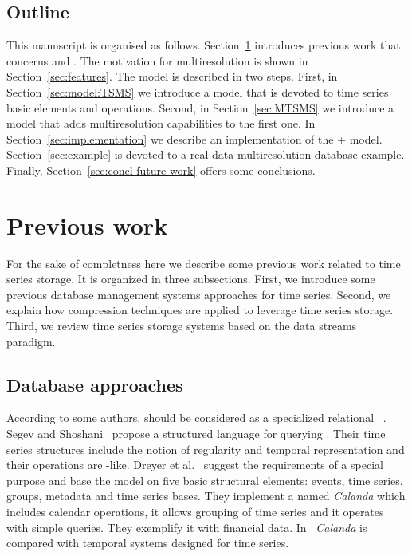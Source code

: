 \subsection{Outline}

This manuscript is organised as
follows. Section~\ref{sec:related-work} introduces previous work that
concerns  and .  The motivation for
multiresolution is shown in Section~\ref{sec:features}.  The model is
described in two steps.
%
First, in Section~\ref{sec:model:TSMS} we introduce a 
model that is devoted to time series basic elements and operations.
%
Second, in Section~\ref{sec:MTSMS} we introduce a  model
that adds multiresolution capabilities to the first one.
%
In Section~\ref{sec:implementation} we describe an implementation of
the + model.  Section~\ref{sec:example} is
devoted to a real data multiresolution database example.  Finally,
Section~\ref{sec:concl-future-work} offers some conclusions.




\section{Previous work}
\label{sec:related-work}

For the sake of completness here we describe some previous work
related to time series storage. It is organized in three subsections.
First, we introduce some previous database management systems
approaches for time series. Second, we explain how compression
techniques are applied to leverage time series storage. Third, we
review time series storage systems based on the data streams paradigm.


\subsection{Database approaches}

According to some authors,  should be considered as a
specialized relational ~\cite{last01}.  Segev and
Shoshani~\cite{segev87:sigmod} propose a structured language for
querying . Their time series structures include the notion
of regularity and temporal representation and their operations are
-like.  Dreyer et al.~\cite{dreyer94} suggest the
requirements of a special purpose  and base the model on
five basic structural elements: events, time series, groups, metadata
and time series bases. They implement a  named
\emph{Calanda} which includes calendar operations, it allows grouping
of time series and it operates with simple queries. They exemplify it
with financial data. In~\cite{schmidt95} \emph{Calanda} is compared
with temporal systems designed for time series.
 
